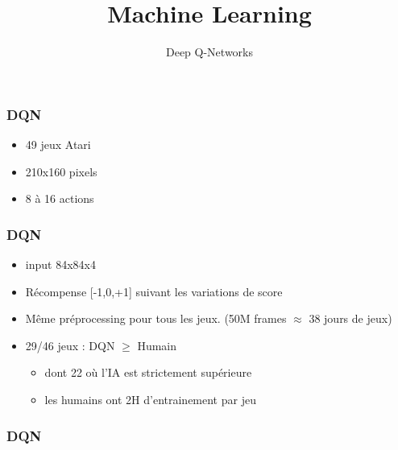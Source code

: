 \documentclass{formation}
\title{Machine Learning}
\subtitle{Deep Q-Networks}
\begin{document}
\maketitle

\begin{frame}
  \frametitle{DQN}
  \begin{itemize}
  \item 49 jeux Atari
  \item 210x160 pixels
  \item 8 à 16 actions
  \end{itemize}
\end{frame}

\begin{frame}
  \frametitle{DQN}
  \begin{itemize}
  \item input 84x84x4
  \item Récompense [-1,0,+1] suivant les variations de score
  \item Même préprocessing pour tous les jeux. (50M frames $\approx$ 38 jours de jeux)
  \item 29/46 jeux : DQN $\geq$ Humain
    \begin{itemize}
    \item dont 22 où l'IA est strictement supérieure
    \item les humains ont 2H d'entrainement par jeu
    \end{itemize}
  \end{itemize}
\end{frame}

\begin{frame}
  \frametitle{DQN}
  \href{https://www.youtube.com/watch?v=lcVg9hVya-c}{}
\end{frame}
\end{document}
